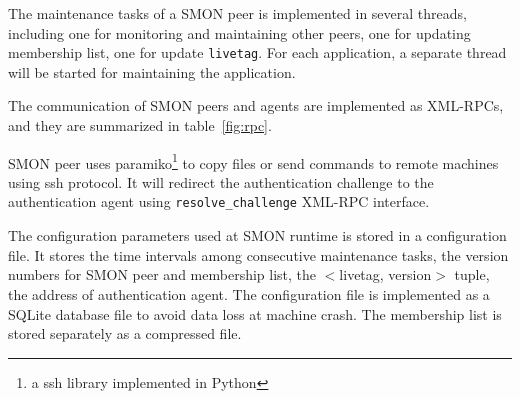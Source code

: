 The maintenance tasks of a SMON peer is implemented in
several threads, including one for monitoring and
maintaining other peers, one for updating membership list,
one for update \texttt{livetag}. For each application, a
separate thread will be started for maintaining the
application.

The communication of SMON peers and agents are implemented
as XML-RPCs, and they are summarized in table~\ref{fig:rpc}.

SMON peer uses paramiko\footnote{a ssh library implemented
in Python} to copy files or send commands to remote machines
using ssh protocol. It will redirect the authentication
challenge to the authentication agent using
\texttt{resolve\_challenge} XML-RPC interface.

The configuration parameters used at SMON runtime is stored
in a configuration file. It stores the time intervals among
consecutive maintenance tasks, the version numbers for SMON
peer and membership list, the $<$livetag, version$>$ tuple,
the address of authentication agent. The configuration file
is implemented as a SQLite database file to avoid data loss
at machine crash. The membership list is stored separately
as a compressed file.




